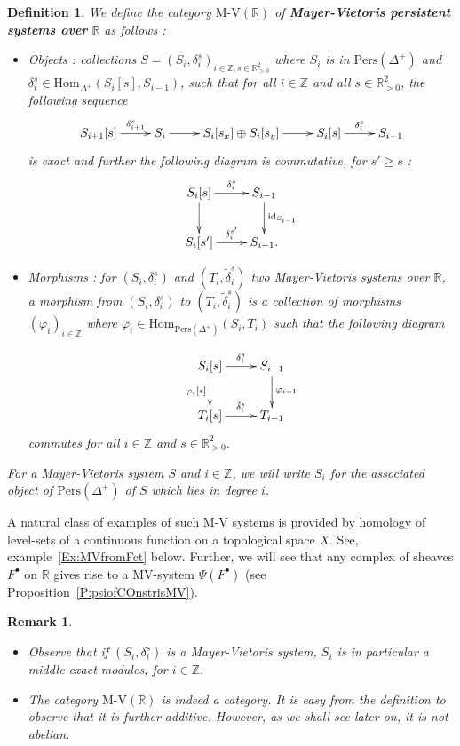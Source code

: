 \documentclass[a4paper, english, 11pt]{article}
\newcommand{\0}{\vec{0}}
\newcommand{\R}[0]{\mathbb{R}}
\newcommand{\Z}[0]{\mathbb{Z}}
\newcommand{\Hom}[0]{\text{Hom}}
\newcommand{\Pers}[0]{\text{Pers}}
\newtheorem{remark}[prop]{Remark}
\newtheorem{defi}[prop]{Definition}
\begin{document}
\begin{defi}\label{D:MVSystem}
We define the category $\text{M-V}(\R)$ of \textbf{Mayer-Vietoris persistent systems over} $\R$ as follows : 

\begin{itemize}
    \item[$\bullet$] Objects : collections $S=(S_i,\delta_i^s)_{i\in \Z,s\in \R_{>0}^2}$ where $S_i$ is in $\text{Pers}(\Delta^+)$ and $\delta_i^s\in \Hom_{\Delta^+}(S_i[s], S_{i-1})$, such that for all $i\in \Z$ and all $s\in \R_{>0}^2$, the following sequence 
    \begin{equation}\xymatrix{S_{i+1}[s] \ar[r]^-{\delta_{i+1}^s} & S_i \ar[r] & S_i[s_x] \oplus S_i[s_y] \ar[r] & S_i[s] \ar[r]^-{\delta_{i}^s} & S_{i-1}}\label{eq:MVSystemles}\end{equation}
    is exact and further the following diagram  is commutative, for $s'\geq s$ :  \begin{equation}\label{D:ComSaquareforMV}\xymatrix{  S_i[s] \ar[r]^-{\delta_{i}^{s}} \ar[d] & S_{i-1} \ar[d]^{\text{id}_{S_{i-1}}} \\
    S_i[s'] \ar[r]^-{{\delta}_{i}^{s'}} & S_{i-1}.}\end{equation}
    
    \item[$\bullet$] Morphisms : for $(S_i,\delta_i^s)$ and $(T_i,\tilde{\delta}_i^s)$ two Mayer-Vietoris systems over $\R$, a morphism from $(S_i,\delta_i^s)$ to $(T_i,\tilde{\delta}_i^s)$ is a collection of morphisms $(\varphi_i)_{i\in \Z}$ where $\varphi_i \in \Hom_{\Pers(\Delta^+)}(S_i,T_i)$ such that the following diagram
    
   \begin{equation}\xymatrix{  S_i[s] \ar[r]^-{\delta_{i}^s} \ar[d]_{\varphi_i[s]} & S_{i-1} \ar[d]^{\varphi_{i-1}} \\
    T_i[s] \ar[r]^-{\tilde{\delta}_{i}^s} & T_{i-1}}\end{equation} commutes for all $i\in \Z$ and $s\in \R_{>0}^2$. 
\end{itemize}
For a Mayer-Vietoris system $S$ and $i\in \Z$, we will write $S_i$ for the associated object of $\Pers(\Delta^+)$ of $S$ which lies in degree $i$.
\end{defi}
A natural class of examples of such M-V systems is provided by homology of level-sets of a  continuous function on a topological space $X$. See, example~\ref{Ex:MVfromFct} below. Further, we will see that any complex of sheaves $F^\bullet$ on $\R$ gives rise to a MV-system $\Psi(F^\bullet)$ (see Proposition~\ref{P:psiofCOnstrisMV}). 
\begin{remark}
\begin{itemize}
    \item Observe that if $(S_i,\delta_i^s)$ is a Mayer-Vietoris system, $S_i$ is in particular a middle exact modules, for $i\in \Z$. 
    \item The category $\text{M-V}(\R)$ is indeed a category. It is easy from the definition to observe that it is further additive. However, as we shall see later on, it is not abelian. 
\end{itemize}
\end{remark}
\end{document}

